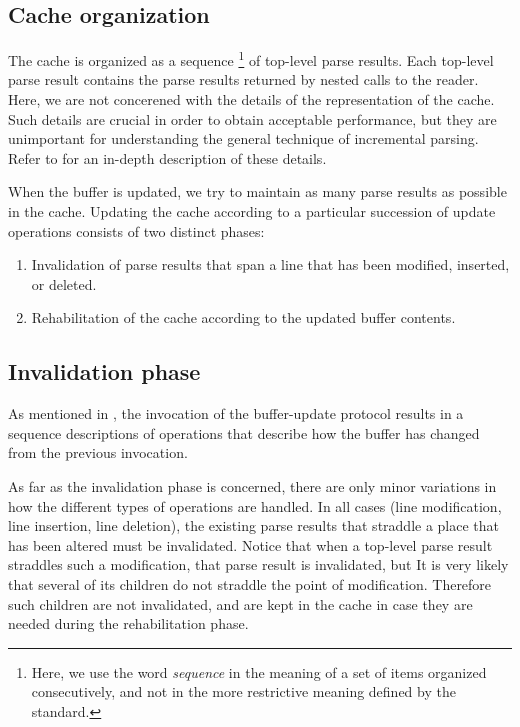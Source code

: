\subsection{Cache organization}

The cache is organized as a sequence%
\footnote{Here, we use the word \emph{sequence} in the meaning of a
  set of items organized consecutively, and not in the more
  restrictive meaning defined by the \commonlisp{} standard.}  of
top-level parse results.  Each top-level parse result contains the
parse results returned by nested calls to the reader.  Here, we are
not concerened with the details of the representation of the cache.
Such details are crucial in order to obtain acceptable performance,
but they are unimportant for understanding the general technique of
incremental parsing.  Refer to  for an
in-depth description of these details.

When the buffer is updated, we try to maintain as many parse results
as possible in the cache.  Updating the cache according to a
particular succession of update operations consists of two distinct
phases:

\begin{enumerate}
\item Invalidation of parse results that span a line that has been
  modified, inserted, or deleted.
\item Rehabilitation of the cache according to the updated buffer
  contents.
\end{enumerate}

\subsection{Invalidation phase}

As mentioned in , the invocation of
the buffer-update protocol results in a sequence descriptions of
operations that describe how the buffer has changed from the previous
invocation.

As far as the invalidation phase is concerned, there are only minor
variations in how the different types of operations are handled.  In
all cases (line modification, line insertion, line deletion), the
existing parse results that straddle a place that has been altered
must be invalidated.  Notice that when a top-level parse result
straddles such a modification, that parse result is invalidated, but
It is very likely that several of its children do not straddle the
point of modification.  Therefore such children are not invalidated,
and are kept in the cache in case they are needed during the
rehabilitation phase.


